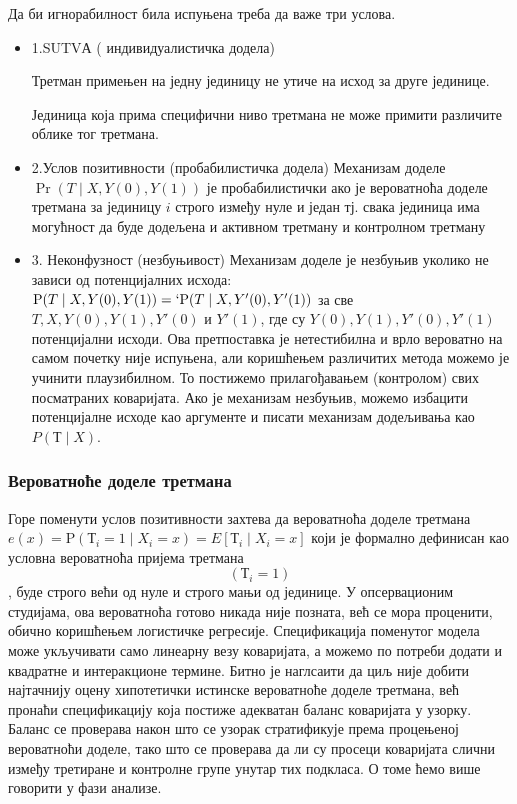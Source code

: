 \documentclass[12pt, a4paper]{article}
\begin{document}
Да би игнорабилност била испуњена треба да важе три услова.
\begin{itemize}
  \item1.SUTVА ( индивидуалистичка додела)

Третман примењен на једну јединицу не утиче на исход за друге јединице. 

Јединица која прима специфични ниво третмана не може примити различите облике тог третмана.
  \item 2.Услов позитивности (пробабилистичка додела)
Механизам доделе $\Pr(T \mid X, Y(0), Y(1))$ је пробабилистички ако је вероватноћа доделе третмана за јединицу $i$ строго између нуле и један тј. свака јединица има могућност да буде додељена и активном третману и контролном третману
  \item 3. Неконфузност (незбуњивост)
Механизам доделе је незбуњив уколико не зависи од потенцијалних исхода: $\text{P}(T \mid X, Y(0), Y(1)) =`\text{P}(T \mid X, Y'(0), Y'(1))$ за све $T, X, Y(0), Y(1), Y'(0)$ и $Y'(1)$, где су $Y(0), Y(1), Y'(0), Y'(1)$ потенцијални исходи.
Ова претпоставка је нетестибилна и врло вероватно на самом почетку није испуњена, али коришћењем различитих метода можемо је учинити плаузибилном. То постижемо прилагођавањем (контролом) свих посматраних коваријата. Ако је механизам незбуњив, можемо избацити потенцијалне исходе као аргументе и писати механизам додељивања као  $P(Т \mid X)$. 
\end{itemize}
\subsubsection{Вероватноће доделе третмана}
Горе поменути услов позитивности захтева да вероватноћа доделе третмана $e(x) = \text{P}(Т_i = 1 \mid X_i = x) = E[Т_i \mid X_i = x]$ који је формално дефинисан као условна вероватноћа пријема третмана $$(Т_i=1)$$, буде строго већи од нуле и строго мањи од јединице.  У опсервационим студијама, ова вероватноћа готово никада није позната, већ се мора проценити, обично коришћењем логистичке регресије. Спецификација поменутог модела може укључивати само линеарну везу коваријата, а можемо по потреби додати и квадратне и интеракционе термине.  Битно је наглсаити да циљ није добити најтачнију оцену хипотетички истинске вероватноће доделе третмана, већ пронаћи спецификацију која постиже адекватан баланс коваријата у узорку. 
Баланс се проверава након што се узорак стратификује према процењеној вероватноћи доделе, тако што се проверава да ли су просеци коваријата слични између третиране и контролне групе унутар тих подкласа. О томе ћемо више говорити у фази анализе.
\end{document}
